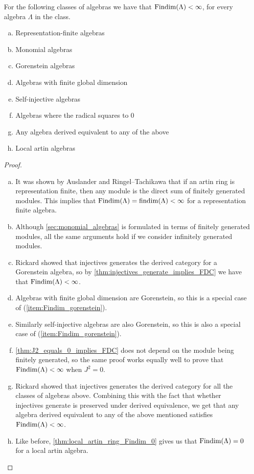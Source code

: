 \begin{theorem}
	For the following classes of algebras we have that $\operatorname{Findim}(\Lambda) < \infty$, for every algebra $\Lambda$ in the class.
	\begin{enumerate}[a)]
		\item Representation-finite algebras
		\item Monomial algebras
		\item Gorenstein algebras
		\item Algebras with finite global dimension
		\item Self-injective algebras
		\item Algebras where the radical squares to 0
		\item Any algebra derived equivalent to any of the above
		\item Local artin algebras
	\end{enumerate}
	\begin{proof}
		\begin{enumerate}[(a)]
			\item It was shown by Auslander and Ringel--Tachikawa that if an artin ring is representation finite, then any module is the direct sum of finitely generated modules\cite{Aus74, RT74}. This implies that $\operatorname{Findim}(\Lambda) = \operatorname{findim}(\Lambda) < \infty$ for a representation finite algebra.
			\item Although \cref{sec:monomial_algebras} is formulated in terms of finitely generated modules, all the same arguments hold if we consider infinitely generated modules. 
			\item \label{item:Findim_gorenstein} Rickard showed that injectives generates the derived category for a Gorenstein algebra\cite{Rick19}, so by \cref{thm:injectives_generate_implies_FDC} we have that $\operatorname{Findim}(\Lambda) < \infty$. 
			\item Algebras with finite global dimension are Gorenstein, so this is a special case of (\ref{item:Findim_gorenstein}).
			\item Similarly self-injective algebras are also Gorenstein, so this is also a special case of (\ref{item:Findim_gorenstein}).
			\item \cref{thm:J2_equals_0_implies_FDC} does not depend on the module being finitely generated, so the same proof works equally well to prove that $\operatorname{Findim}(\Lambda) < \infty$ when $J^2 = 0$.
			\item Rickard showed that injectives generates the derived category for all the classes of algebras above\cite[Corrolary~7.(4-6)]{Rick19}. Combining this with the fact that whether injectives generate is preserved under derived equivalence\cite[Theorem3.4]{Rick19}, we get that any algebra derived equivalent to any of the above mentioned satisfies $\operatorname{Findim}(\Lambda) < \infty$.
			\item Like before, \cref{thm:local_artin_ring_Findim_0} gives us that $\operatorname{Findim}(\Lambda)=0$ for a local artin algebra.
		\end{enumerate}
	\end{proof}
\end{theorem}

